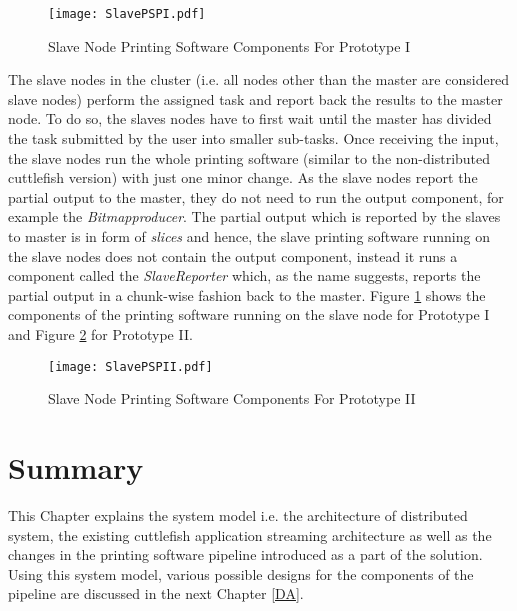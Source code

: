 \begin{figure}[b]
\centering
\texttt{[image: SlavePSPI.pdf]}
\caption{Slave Node Printing Software Components For Prototype I }
\label{fig:SlavePS}
\end{figure}

The slave nodes in the cluster (i.e. all nodes other than the master are considered slave nodes) perform the assigned task and report back the results to the master node. To do so, the slaves nodes have to first wait until the master has divided the task submitted by the user into smaller sub-tasks. Once receiving the input, the slave nodes run the whole printing software (similar to the non-distributed cuttlefish version) with just one minor change. As the slave nodes report the partial output to the master, they do not need to run the output component, for example the \textit{Bitmapproducer}. The partial output which is reported by the slaves to master is in form of \textit{slices} and hence, the slave printing software running on the slave nodes does not contain the output component, instead it runs a component called the \textit{SlaveReporter} which, as the name suggests, reports the partial output in a chunk-wise fashion back to the master. Figure \ref{fig:SlavePS} shows the components of the printing software running on the slave node for Prototype I and Figure \ref{fig:SlavePSII} for Prototype II.

\begin{figure}[t]
\centering
\texttt{[image: SlavePSPII.pdf]}
\caption{Slave Node Printing Software Components For Prototype II }
\label{fig:SlavePSII}
\end{figure}

\section{Summary}

This Chapter explains the system model i.e. the architecture of distributed system, the existing cuttlefish application streaming architecture as well as the changes in the printing software pipeline introduced as a part of the solution.  Using this system model, various possible designs for the components of the pipeline are discussed in the next Chapter \ref{DA}.

\clearpage
